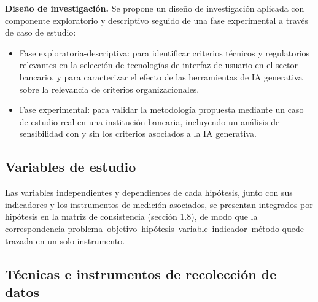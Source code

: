 \textbf{Diseño de investigación.} Se propone un diseño de investigación
        aplicada con componente exploratorio y descriptivo seguido de una fase
        experimental a través de caso de estudio:
        \begin{itemize}
          \item Fase exploratoria-descriptiva: para identificar criterios
                técnicos y regulatorios relevantes en la selección de
                tecnologías de interfaz de usuario en el sector bancario, y
                para caracterizar el efecto de las herramientas de IA
                generativa sobre la relevancia de criterios organizacionales.
          \item Fase experimental: para validar la metodología propuesta
                mediante un caso de estudio real en una institución bancaria,
                incluyendo un análisis de sensibilidad con y sin los criterios
                asociados a la IA generativa.
        \end{itemize}


\subsection{Variables de estudio}

Las variables independientes y dependientes de cada hipótesis, junto con sus
indicadores y los instrumentos de medición asociados, se presentan integrados
por hipótesis en la matriz de consistencia (sección 1.8), de modo que la
correspondencia problema--objetivo--hipótesis--variable--indicador--método
quede trazada en un solo instrumento.


\subsection{Técnicas e instrumentos de recolección de datos}

